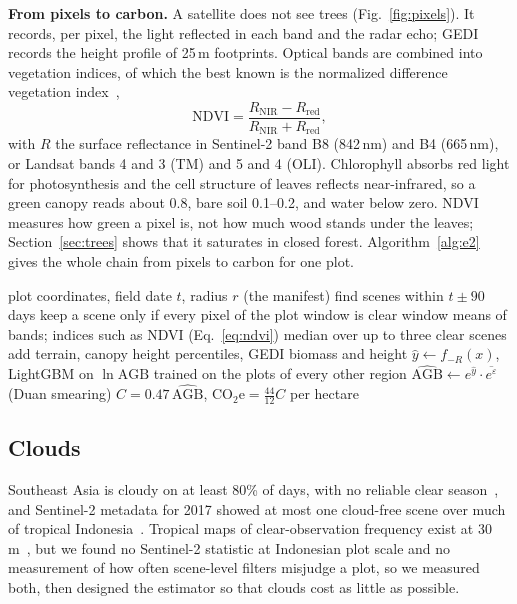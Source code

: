\documentclass[conference,a4paper]{IEEEtran}
\begin{document}
\textbf{From pixels to carbon.} A satellite does not see trees (Fig.~\ref{fig:pixels}). It records, per pixel, the light reflected in each band and the radar echo; GEDI records the height profile of 25\,m footprints. Optical bands are combined into vegetation indices, of which the best known is the normalized difference vegetation index~\cite{tucker1979red},
\begin{equation}
\mathrm{NDVI}=\frac{R_{\mathrm{NIR}}-R_{\mathrm{red}}}{R_{\mathrm{NIR}}+R_{\mathrm{red}}},
\label{eq:ndvi}
\end{equation}
with $R$ the surface reflectance in Sentinel-2 band B8 (842\,nm) and B4 (665\,nm), or Landsat bands 4 and 3 (TM) and 5 and 4 (OLI). Chlorophyll absorbs red light for photosynthesis and the cell structure of leaves reflects near-infrared, so a green canopy reads about 0.8, bare soil 0.1--0.2, and water below zero. NDVI measures how green a pixel is, not how much wood stands under the leaves; Section~\ref{sec:trees} shows that it saturates in closed forest. Algorithm~\ref{alg:e2} gives the whole chain from pixels to carbon for one plot.

\begin{algorithm}[t]
\caption{Satellite to Carbon for One Plot (E2)}
\label{alg:e2}
\footnotesize
\begin{algorithmic}[1]
\Require plot coordinates, field date $t$, radius $r$ (the manifest)
\State find scenes within $t\pm90$\,days
\State keep a scene only if every pixel of the plot window is clear
\State window means of bands; indices such as NDVI (Eq.~\ref{eq:ndvi})
\State median over up to three clear scenes
\EndFor
\State add terrain, canopy height percentiles, GEDI biomass and height
\State $\hat y\gets f_{-R}(x)$, LightGBM on $\ln\mathrm{AGB}$ trained on the plots of every other region
\State $\widehat{\mathrm{AGB}}\gets e^{\hat y}\cdot\overline{e^{\varepsilon}}$ (Duan smearing)
\State \Return $C=0.47\,\widehat{\mathrm{AGB}}$, $\mathrm{CO_2e}=\frac{44}{12}C$ per hectare
\end{algorithmic}
\end{algorithm}

\subsection{Clouds}
Southeast Asia is cloudy on at least 80\% of days, with no reliable clear season~\cite{wilson2016cloud}, and Sentinel-2 metadata for 2017 showed at most one cloud-free scene over much of tropical Indonesia~\cite{sudmanns2020eocompass}. Tropical maps of clear-observation frequency exist at 30\,m~\cite{floresanderson2023clear}, but we found no Sentinel-2 statistic at Indonesian plot scale and no measurement of how often scene-level filters misjudge a plot, so we measured both, then designed the estimator so that clouds cost as little as possible.
\end{document}
